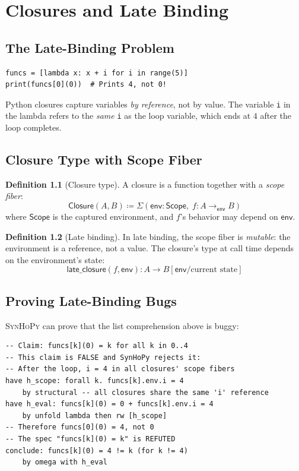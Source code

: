 \documentclass[11pt,a4paper]{report}
\theoremstyle{definition}
\newtheorem{definition}{Definition}[chapter]
\theoremstyle{plain}
\newcommand{\defeq}{\coloneqq}
\newcommand{\synhopy}{\textsc{SynHoPy}}
\begin{document}
\chapter{Closures and Late Binding}
\label{ch:closures}

\section{The Late-Binding Problem}

\begin{lstlisting}[style=python]
funcs = [lambda x: x + i for i in range(5)]
print(funcs[0](0))  # Prints 4, not 0!
\end{lstlisting}

Python closures capture variables \emph{by reference}, not by value. The variable
\texttt{i} in the lambda refers to the \emph{same} \texttt{i} as the loop
variable, which ends at $4$ after the loop completes.

\section{Closure Type with Scope Fiber}

\begin{definition}[Closure type]
A closure is a function together with a \emph{scope fiber}:
\[
  \mathsf{Closure}(A, B) \defeq \Sigma(
    \mathsf{env} : \mathsf{Scope},\;
    f : A \to_{\mathsf{env}} B
  )
\]
where $\mathsf{Scope}$ is the captured environment, and $f$'s behavior may
depend on $\mathsf{env}$.
\end{definition}

\begin{definition}[Late binding]
In late binding, the scope fiber is \emph{mutable}: the environment is a reference,
not a value. The closure's type at call time depends on the environment's state:
\[
  \mathsf{late\_closure}(f, \mathsf{env}) : A \to B[\mathsf{env}/\text{current state}]
\]
\end{definition}

\section{Proving Late-Binding Bugs}

\synhopy{} can prove that the list comprehension above is buggy:

\begin{lstlisting}[style=proof]
-- Claim: funcs[k](0) = k for all k in 0..4
-- This claim is FALSE and SynHoPy rejects it:
-- After the loop, i = 4 in all closures' scope fibers
have h_scope: forall k. funcs[k].env.i = 4
    by structural -- all closures share the same 'i' reference
have h_eval: funcs[k](0) = 0 + funcs[k].env.i = 4
    by unfold lambda then rw [h_scope]
-- Therefore funcs[0](0) = 4, not 0
-- The spec "funcs[k](0) = k" is REFUTED
conclude: funcs[k](0) = 4 != k (for k != 4)
    by omega with h_eval
\end{lstlisting}
\end{document}
